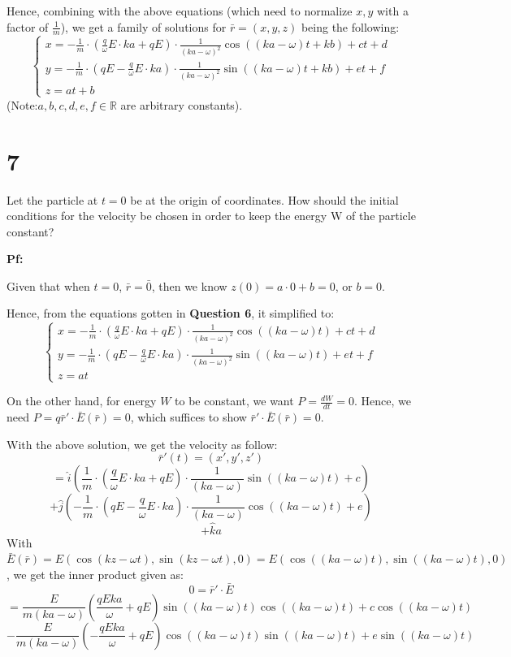\documentclass{article}
\begin{document}
\hfil

Hence, combining with the above equations (which need to normalize $x,y$ with a factor of $\frac{1}{m}$), we get a family of solutions for $\bar{r}=(x,y,z)$ being the following:
$$\begin{cases}
    x = -\frac{1}{m}\cdot\left(\frac{q}{\omega}E\cdot ka+qE\right)\cdot\frac{1}{(ka-\omega)^2}\cos((ka-\omega)t+kb)+ct+d\\
    y = -\frac{1}{m}\cdot \left(qE-\frac{q}{\omega}E\cdot ka\right)\cdot\frac{1}{(ka-\omega)^2}\sin((ka-\omega)t+kb)+et+f\\
    z = at+b
\end{cases}$$
(Note:$a,b,c,d,e,f\in\mathbb{R}$ are arbitrary constants).

\break

\section*{7}
\begin{myBox}[]{}
    Let the particle at $t = 0$ be at the origin of coordinates. How should the initial conditions for the velocity be chosen in order to keep the energy W of the particle constant?
\end{myBox}

\textbf{Pf:}

Given that when $t=0$, $\bar{r}=\bar{0}$, then we know $z(0)=a\cdot 0+b = 0$, or $b=0$.

Hence, from the equations gotten in \textbf{Question 6}, it simplified to:
$$\begin{cases}
    x = -\frac{1}{m}\cdot\left(\frac{q}{\omega}E\cdot ka+qE\right)\cdot\frac{1}{(ka-\omega)^2}\cos((ka-\omega)t)+ct+d\\
    y = -\frac{1}{m}\cdot \left(qE-\frac{q}{\omega}E\cdot ka\right)\cdot\frac{1}{(ka-\omega)^2}\sin((ka-\omega)t)+et+f\\
    z = at
\end{cases}$$

On the other hand, for energy $W$ to be constant, we want $P=\frac{dW}{dt}=0$. Hence, we need $P=q\bar{r}'\cdot \bar{E}(\bar{r})=0$,
which suffices to show $\bar{r}'\cdot \bar{E}(\bar{r})=0$.

With the above solution, we get the velocity as follow:
$$\bar{r}'(t)=(x',y',z') $$
$$= \hat{i}\left(\frac{1}{m}\cdot\left(\frac{q}{\omega}E\cdot ka+qE\right)\cdot\frac{1}{(ka-\omega)}\sin((ka-\omega)t)+c\right)$$
$$ + \hat{j}\left(-\frac{1}{m}\cdot\left(qE-\frac{q}{\omega}E\cdot ka\right)\cdot\frac{1}{(ka-\omega)}\cos((ka-\omega)t)+e\right)$$
$$+\hat{k}a$$
With $\bar{E}(\bar{r})=E(\cos(kz-\omega t),\sin(kz-\omega t),0)=E(\cos((ka-\omega)t),\sin((ka-\omega)t),0)$, we get the inner product given as:
$$0=\bar{r}'\cdot \bar{E}$$
$$= \frac{E}{m(ka-\omega)}\left(\frac{qEka}{\omega}+qE\right)\sin((ka-\omega)t)\cos((ka-\omega)t) + c\cos((ka-\omega)t)$$
$$ - \frac{E}{m(ka-\omega)}\left(-\frac{qEka}{\omega}+qE\right)\cos((ka-\omega)t)\sin((ka-\omega)t)+e\sin((ka-\omega)t)$$
\end{document}
